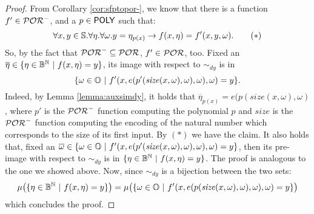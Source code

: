 \lemmataskCone*
\begin{proof}
  From Corollary \ref{cor:sfptopor-}, we know that there is a function $f'\in \mathcal{POR}^-$,
  and a $p \in \mathsf{POLY}$ such that:
  \begin{equation}
  \forall x, y \in \mathbb{S}.\forall \eta.\forall \omega. y = \eta_{p(x)} \to  f(x, \eta) = f'(x, y, \omega).\tag{$*$}
\end{equation}
  So, by the fact that $\mathcal{POR}^- \subseteq \mathcal{POR}$, $f' \in \mathcal{POR}$, too.
  Fixed an $\overline \eta \in \{\eta \in \Bool^\Nat \ | \ f(x, \eta)=y \}$,
  its image with respect to $\sim_{\mathit{dy}}$
  is in
  $$
  \{\omega \in \mathbb{O} \ | \ f'(x, e(p'(\mathit{size}(x, \omega), \omega), \omega), \omega) =y\}.
  $$
  Indeed, by Lemma \ref{lemma:auxsimdy}, it holds that
  $\overline \eta_{p(x)} = e(p(\mathit{size}(x, \omega), \omega)$, where $p'$ is the $\mathcal{POR}^-$
  function computing the polynomial $p$ and $\mathit{size}$ is the $\mathcal{POR}^-$
  function computing the encoding of the natural number which corresponds to the
  size of its first input. By $(*)$ we have the claim.
  It also holds that, fixed an $\overline \omega \in \{\omega \in \mathbb{O} \ | \ f'(x, e(p'(\mathit{size}(x, \omega), \omega), \omega), \omega) =y\}$,
  then its pre-image with respect to $\sim_{\mathit{dy}}$ is in $\{\eta \in \mathbb{B}^{\mathbb{N}} \ | \ f(x, \eta)=y \}$.
  The proof is analogous to the one we showed above.
  Now, since $\sim_{\mathit{dy}}$ is a bijection between the two sets:
  $$
  \mu\big(\{\eta \in \mathbb{B}^{\mathbb{N}} \ | \ f(x, \eta)=y \}\big)
  = \mu\big(\{\omega \in \mathbb{O} \ | \ f'(x, e(p(\mathit{size}(x, \omega), \omega), \omega), \omega) =y\}\big)
  $$
  which concludes the proof.
\end{proof}



\newpage
